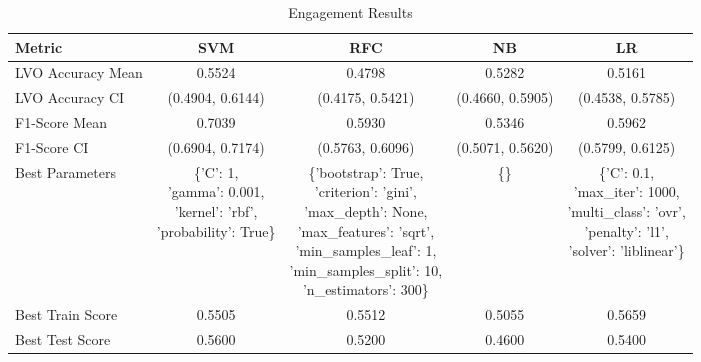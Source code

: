 \begin{table}[h!]
\centering
\begin{tabular}{|l|c|c|c|c|}
\hline
\textbf{Metric}           & \textbf{SVM}    & \textbf{RFC}    & \textbf{NB}     & \textbf{LR}     \\ \hline
LVO Accuracy Mean         & 0.5524          & 0.4798          & 0.5282          & 0.5161          \\ \hline
LVO Accuracy CI           & (0.4904, 0.6144)& (0.4175, 0.5421)& (0.4660, 0.5905)& (0.4538, 0.5785)\\ \hline
F1-Score Mean             & 0.7039          & 0.5930          & 0.5346          & 0.5962          \\ \hline
F1-Score CI               & (0.6904, 0.7174)& (0.5763, 0.6096)& (0.5071, 0.5620)& (0.5799, 0.6125)\\ \hline
Best Parameters           & \makecell[l]{\{'C': 1,\\ 'gamma': 0.001,\\ 'kernel': 'rbf',\\ 'probability': True\}} & \makecell[l]{\{'bootstrap': True,\\ 'criterion': 'gini',\\ 'max\_depth': None,\\ 'max\_features': 'sqrt',\\ 'min\_samples\_leaf': 1,\\ 'min\_samples\_split': 10,\\ 'n\_estimators': 300\}} & \{\} & \makecell[l]{\{'C': 0.1,\\ 'max\_iter': 1000,\\ 'multi\_class': 'ovr',\\ 'penalty': 'l1',\\ 'solver': 'liblinear'\}} \\ \hline
Best Train Score          & 0.5505          & 0.5512          & 0.5055          & 0.5659          \\ \hline
Best Test Score           & 0.5600          & 0.5200          & 0.4600          & 0.5400          \\ \hline
\end{tabular}
\caption{Engagement Results}
\label{table:engagement}
\end{table}
